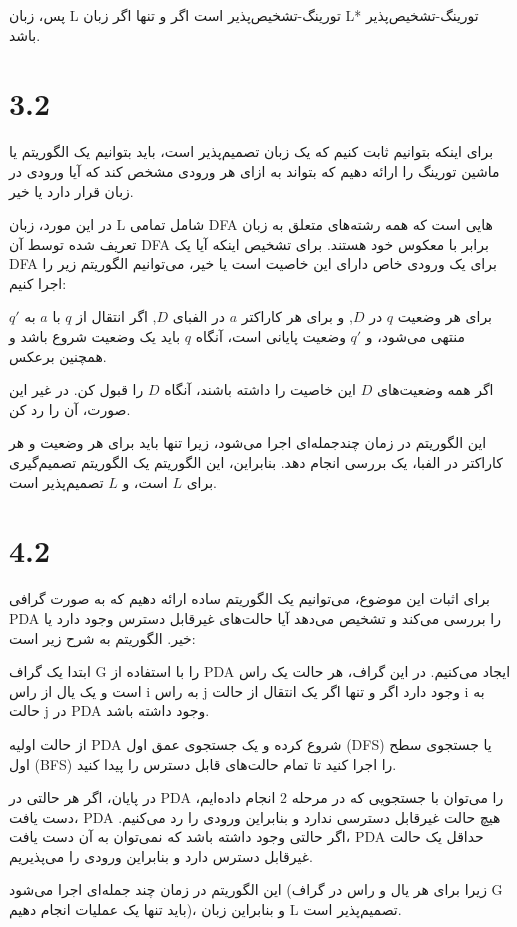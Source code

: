 پس، زبان L تورینگ-تشخیص‌پذیر است اگر و تنها اگر زبان L* تورینگ-تشخیص‌پذیر باشد.


\section*{3.2}

برای اینکه بتوانیم ثابت کنیم که یک زبان تصمیم‌پذیر است، باید بتوانیم یک الگوریتم یا ماشین تورینگ را ارائه دهیم که بتواند به ازای هر ورودی مشخص کند که آیا ورودی در زبان قرار دارد یا خیر.

در این مورد، زبان L شامل تمامی DFA هایی است که همه رشته‌های متعلق به زبان تعریف شده توسط آن DFA برابر با معکوس خود هستند. برای تشخیص اینکه آیا یک DFA برای یک ورودی خاص دارای این خاصیت است یا خیر، می‌توانیم الگوریتم زیر را اجرا کنیم:

برای هر وضعیت $q$ در $D$, و برای هر کاراکتر $a$ در الفبای $D$, اگر انتقال از $q$ با $a$ به $q'$ منتهی می‌شود، و $q'$ وضعیت پایانی است، آنگاه $q$ باید یک وضعیت شروع باشد و همچنین برعکس.

اگر همه وضعیت‌های $D$ این خاصیت را داشته باشند، آنگاه $D$ را قبول کن. در غیر این صورت، آن را رد کن.

این الگوریتم در زمان چندجمله‌ای اجرا می‌شود، زیرا تنها باید برای هر وضعیت و هر کاراکتر در الفبا، یک بررسی انجام دهد. بنابراین، این الگوریتم یک الگوریتم تصمیم‌گیری برای $L$ است، و $L$ تصمیم‌پذیر است.


\section*{4.2}

برای اثبات این موضوع، می‌توانیم یک الگوریتم ساده ارائه دهیم که به صورت گرافی PDA را بررسی می‌کند و تشخیص می‌دهد آیا حالت‌های غیرقابل دسترس وجود دارد یا خیر. الگوریتم به شرح زیر است:

ابتدا یک گراف G را با استفاده از PDA ایجاد می‌کنیم. در این گراف، هر حالت یک راس است و یک یال از راس i به راس j وجود دارد اگر و تنها اگر یک انتقال از حالت i به حالت j در PDA وجود داشته باشد.

از حالت اولیه PDA شروع کرده و یک جستجوی عمق اول (DFS) یا جستجوی سطح اول (BFS) را اجرا کنید تا تمام حالت‌های قابل دسترس را پیدا کنید.

در پایان، اگر هر حالتی در PDA را می‌توان با جستجویی که در مرحله 2 انجام داده‌ایم، دست یافت، PDA هیچ حالت غیرقابل دسترسی ندارد و بنابراین ورودی را رد می‌کنیم. اگر حالتی وجود داشته باشد که نمی‌توان به آن دست یافت، PDA حداقل یک حالت غیرقابل دسترس دارد و بنابراین ورودی را می‌پذیریم.

این الگوریتم در زمان چند جمله‌ای اجرا می‌شود (زیرا برای هر یال و راس در گراف G باید تنها یک عملیات انجام دهیم)، و بنابراین زبان L تصمیم‌پذیر است.
